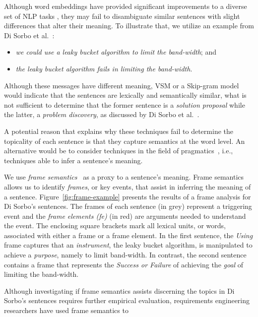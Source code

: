 Although word embeddings have provided significant improvements to a diverse set of NLP tasks , they may fail to disambiguate similar sentences with slight differences that alter their meaning. To illustrate that, we utilize an example
from Di Sorbo et al.~\cite{Sorbo2015}:


\begin{itemize}
\item  \textit{we could use a leaky bucket algorithm to limit the band-width}; and
\item \textit{the leaky bucket algorithm fails in limiting the band-width}.
\end{itemize}

Although these messages have different meaning, \acs{VSM} or a Skip-gram model would indicate that the sentences are lexically and semantically similar, what is not sufficient to determine that the former sentence
 is a \textit{solution proposal} while the latter, a \textit{problem discovery}, as discussed by Di Sorbo et al.~\cite{Sorbo2015}. 


A potential reason that explains why these techniques fail to determine the topicality of each sentence is that they capture semantics at the word level. 
An alternative would be to consider techniques in the field of pragmatics~\cite{ariel2008pragmatics, austin1975pragmatics}, i.e., techniques able to infer a sentence's meaning.



We use \textit{frame semantics}~\cite{fillmore1976frame, Baker1998} as a proxy to a sentence's meaning.
Frame semantics allows us to identify \textit{frames},
or key events, that assist in inferring the meaning of a sentence.
Figure~\ref{fig:frame-example} presents the results of a frame
analysis for Di Sorbo's sentences.
The frames of each sentence (in grey) represent a
triggering event and the \textit{frame elements (fe)} (in red) are arguments needed
to understand the event. The enclosing square brackets
mark all lexical units, or words,
associated with either a frame or a frame element.
In the first sentence, the \textit{Using} frame
captures that an \textit{instrument}, the leaky bucket algorithm, is
manipulated to achieve a \textit{purpose}, namely to limit band-width.
In contrast, the second sentence contains a frame that represents the \textit{Success or Failure}
of achieving the \textit{goal} of limiting the band-width. 





Although investigating if frame semantics assists discerning the topics in Di Sorbo's sentences requires further empirical evaluation, requirements engineering researchers have used frame semantics to 




